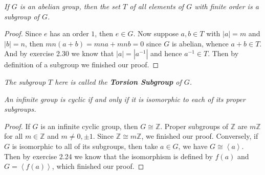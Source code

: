 \begin{problem}\em
If $G$ is an abelian group, then the set $T$ of all elements of $G$ with finite order is a subgroup of $G$.
\end{problem}
\begin{proof}
Since $e$ has an order $1$, then $e\in G$. Now suppose $a,b\in T$ with $|a|=m$ and $|b|=n$, then $mn(a+b)=mna+mnb=0$ since $G$ is abelian, whence $a+b\in T$. And by exercise 2.30 we know that $|a|=|a^{-1}|$ and hence $a^{-1}\in T$. Then by definition of a subgroup we finished our proof.
\end{proof}
\begin{note}\em
The subgroup $T$ here is called the \textbf{Torsion Subgroup} of $G$.
\end{note}
\begin{problem}\em
An infinite group is cyclic if and only if it is isomorphic to each of its proper subgroups.
\end{problem}
\begin{proof}
If $G$ is an infinite cyclic group, then $G\cong\mathbb{Z}$. Proper subgroups of $\mathbb{Z}$ are $m\mathbb{Z}$ for all $m\in\mathbb{Z}$ and $m\ne 0,\pm 1$. Since $\mathbb{Z}\cong m\mathbb{Z}$, we finished our proof. Conversely, if $G$ is isomorphic to all of its subgroups, then take $a\in G$, we have $G\cong\left<a\right>$. Then by exercise 2.24 we know that the isomorphism is defined by $f(a)$ and $G=\left<f(a)\right>$, which finished our proof.
\end{proof}
